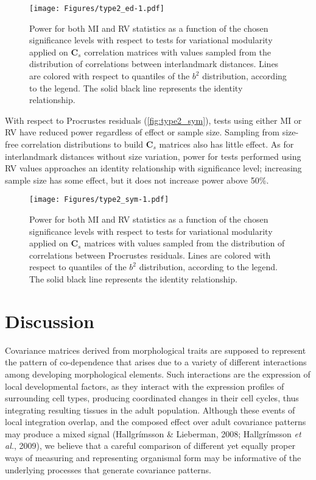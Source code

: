 \documentclass[12pt,twoside]{report}
\begin{document}
\begin{figure}[htbp]
\centering
\texttt{[image: Figures/type2\_ed-1.pdf]}
\caption{Power for both MI and RV statistics as a function of the chosen
significance levels with respect to tests for variational modularity
applied on $\mathbf{C}_s$ correlation matrices with values sampled from
the distribution of correlations between interlandmark distances. Lines
are colored with respect to quantiles of the $b^2$ distribution,
according to the legend. The solid black line represents the identity
relationship. \label{fig:type2_ed}}
\end{figure}

With respect to Procrustes residuals (\autoref{fig:type2_sym}), tests
using either MI or RV have reduced power regardless of effect or sample
size. Sampling from size-free correlation distributions to build
$\mathbf{C}_s$ matrices also has little effect. As for interlandmark
distances without size variation, power for tests performed using RV
values approaches an identity relationship with significance level;
increasing sample size has some effect, but it does not increase power
above 50\%.

\begin{figure}[htbp]
\centering
\texttt{[image: Figures/type2\_sym-1.pdf]}
\caption{Power for both MI and RV statistics as a function of the chosen
significance levels with respect to tests for variational modularity
applied on $\mathbf{C}_s$ matrices with values sampled from the
distribution of correlations between Procrustes residuals. Lines are
colored with respect to quantiles of the $b^2$ distribution, according
to the legend. The solid black line represents the identity
relationship. \label{fig:type2_sym}}
\end{figure}

\section{Discussion}\label{discussion}

Covariance matrices derived from morphological traits are supposed to
represent the pattern of co-dependence that arises due to a variety of
different interactions among developing morphological elements. Such
interactions are the expression of local developmental factors, as they
interact with the expression profiles of surrounding cell types,
producing coordinated changes in their cell cycles, thus integrating
resulting tissues in the adult population. Although these events of
local integration overlap, and the composed effect over adult covariance
patterns may produce a mixed signal (Hallgrímsson \& Lieberman, 2008;
Hallgrímsson \emph{et al.}, 2009), we believe that a careful comparison
of different yet equally proper ways of measuring and representing
organismal form may be informative of the underlying processes that
generate covariance patterns.
\end{document}
